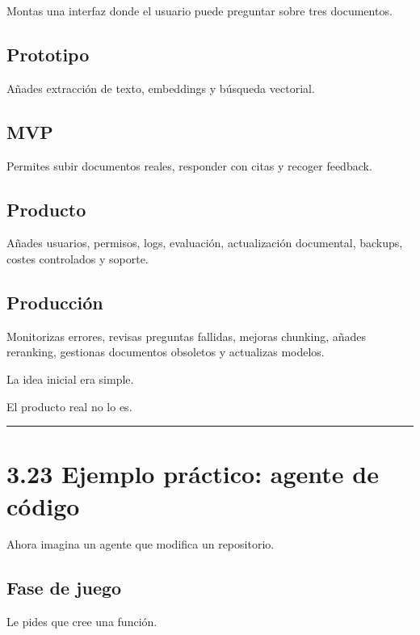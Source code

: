 Montas una interfaz donde el usuario puede preguntar sobre tres
documentos.

\subsection{Prototipo}\label{prototipo}

Añades extracción de texto, embeddings y búsqueda vectorial.

\subsection{MVP}\label{mvp}

Permites subir documentos reales, responder con citas y recoger
feedback.

\subsection{Producto}\label{producto}

Añades usuarios, permisos, logs, evaluación, actualización documental,
backups, costes controlados y soporte.

\subsection{Producción}\label{producciuxf3n}

Monitorizas errores, revisas preguntas fallidas, mejoras chunking,
añades reranking, gestionas documentos obsoletos y actualizas modelos.

La idea inicial era simple.

El producto real no lo es.

\begin{center}\rule{0.5\linewidth}{0.5pt}\end{center}

\section{3.23 Ejemplo práctico: agente de
código}\label{ejemplo-pruxe1ctico-agente-de-cuxf3digo}

Ahora imagina un agente que modifica un repositorio.

\subsection{Fase de juego}\label{fase-de-juego-1}

Le pides que cree una función.

